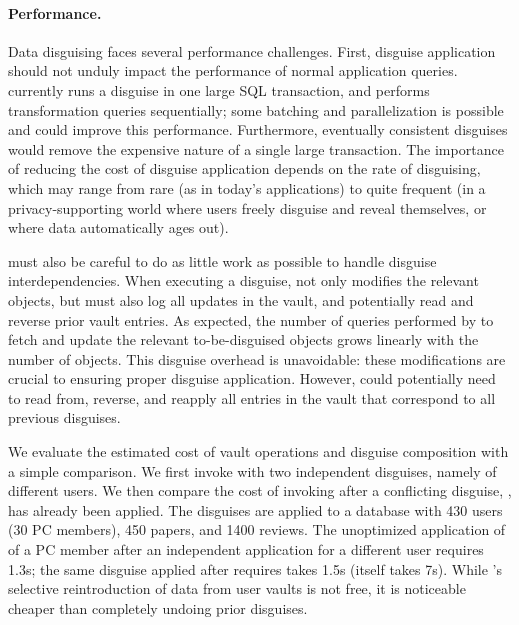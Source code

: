 \paragraph{Performance.}
\label{sec:perf}

Data disguising faces several performance challenges. 
%
First, disguise application should not unduly impact the performance of normal application queries.
\sys currently runs a disguise in one large SQL transaction, and performs transformation queries
sequentially; some batching and parallelization is possible and could improve this performance.
Furthermore, eventually consistent disguises would remove the expensive nature of a single large
transaction.  The importance of reducing the cost of disguise application depends on the rate of
disguising, which may range from rare (as in today's applications) to quite frequent (in a
privacy-supporting world where users freely disguise and reveal themselves, or where data
automatically ages out).

%
\sys must also be careful to do as little work as possible to handle disguise interdependencies. 
When executing a disguise, \sys not only modifies the relevant objects, but must also 
log all updates in the vault, and potentially read and reverse prior vault entries.
%
As expected, the number of queries performed by \sys to fetch and update the relevant to-be-disguised objects
grows linearly with the number of objects. This disguise overhead is unavoidable: these
modifications are crucial to ensuring proper disguise application. 
However, \sys could potentially need to read from, reverse, and reapply all entries in the vault
that correspond to all previous disguises.

We evaluate the estimated cost of vault operations and disguise composition with a simple
comparison. We first invoke \sys with two independent disguises, namely \hrtbf of different
users. We then compare the cost of invoking \hrtbf after a conflicting disguise, \hconfanon, has
already been applied.
The disguises are applied to a database with 430 users (30 PC members), 450 papers, and 1400 
reviews.
The unoptimized application of \hrtbf of a PC member after an independent \hrtbf application for a different user requires 1.3s;
the same \hrtbf disguise applied after \hconfanon requires takes 1.5s (\hconfanon itself takes
7s). While \sys's selective reintroduction of data from user vaults is not free, it is noticeable
cheaper than completely undoing prior disguises.
